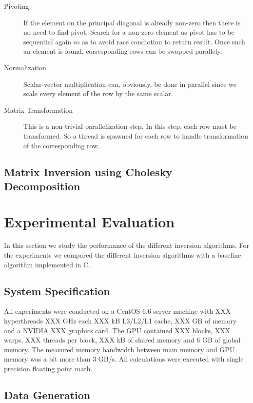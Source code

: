 \documentclass[11pt]{article}
\begin{document}
\begin{description}
	\item[Pivoting] If the element on the principal diagonal is already non-zero then there is no need to find pivot. Search for a non-zero element as pivot has to be sequential again so as to avoid race condiotion to return result. Once such an element is found, corresponding rows can be swapped parallely.
	\item[Normalization] Scalar-vector multiplication can, obviously, be done in parallel since we scale every element of the row by the same scalar.
	\item[Matrix Transformation] This is a non-trivial parallelization step. In this step, each row must be transformed. So a thread is spawned for each row to handle transformation of the corresponding row.
\end{description}

\subsection{Matrix Inversion using Cholesky Decomposition}

\section{Experimental Evaluation}

In this section we study the performance of the different inversion algorithms. For the experiments we compared the different inversion algorithms with a baseline algorithm implemented in C.

\subsection{System Specification}

All experiments were conducted on a CentOS 6.6 server machine with XXX hyperthreads XXX GHz each XXX kB L3/L2/L1 cache, XXX GB of memory and a NVIDIA XXX graphics card. The GPU contained XXX blocks, XXX warps, XXX threads per block, XXX kB of shared memory and 6 GB of global memory. The measured memory bandwidth between main memory and GPU memory was a bit more than 3 GB/s. All calculations were executed with single precision floating point math.

\subsection{Data Generation}
\end{document}
